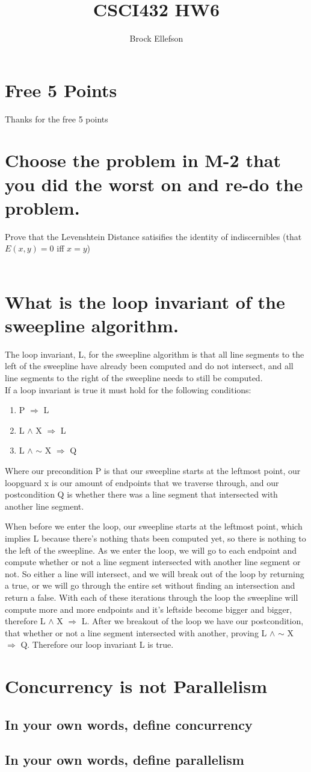 \documentclass[10pt,a4paper]{article}
\author{Brock Ellefson}
\title{CSCI432 HW6}
\begin{document}
\maketitle
\section{Free 5 Points}
Thanks for the free 5 points
\section{Choose the problem in M-2 that you did the worst on and re-do the problem.}
Prove that the Levenshtein Distance satisifies the identity of indiscernibles (that $E(x,y) = 0$ iff $x=y$)\\
\\
\section{What is the loop invariant of the sweepline algorithm.}


The loop invariant, L, for the sweepline algorithm is that all line segments to the left of the sweepline have already been computed and do not intersect, and all line segments to the right of the sweepline needs to still be computed.\\
If a loop invariant is true it must hold for the following conditions:
\begin{enumerate}
  \item P $\Rightarrow$ L 
  \item L $\wedge$ X $\Rightarrow$ L
  \item L $\wedge$ $\sim$ X $\Rightarrow$ Q
\end{enumerate}

Where our precondition P is that our sweepline starts at the leftmost point, our loopguard x is our amount of endpoints that we traverse through, and our postcondition Q is whether there was a line segment that intersected with another line segment.

When before we enter the loop, our sweepline starts at the leftmost point, which implies L because there's nothing thats been computed yet, so there is nothing to the left of the sweepline. As we enter the loop, we will go to each endpoint and compute whether or not a line segment intersected with another line segment or not. So either a line will intersect, and we will break out of the loop by returning a true, or we will go through the entire set without finding an intersection and return a false. With each of these iterations through the loop the sweepline will compute more and more endpoints and it's leftside become bigger and bigger, therefore 
L $\wedge$ X $\Rightarrow$ L. After we breakout of the loop we have our postcondition, that whether or not a line segment intersected with another, proving L $\wedge$ $\sim$ X $\Rightarrow$ Q. Therefore our loop invariant L is true.

\section{Concurrency is not Parallelism}
\subsection{In your own words, define concurrency}
\subsection{In your own words, define parallelism}
\end{document}
